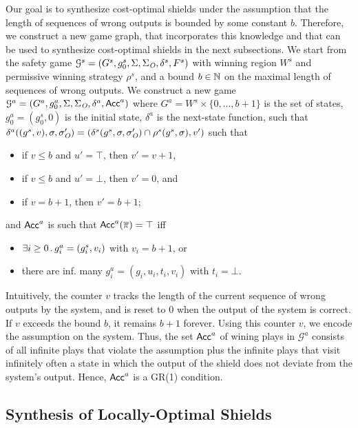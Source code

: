 Our goal is to synthesize cost-optimal shields under the assumption that the length of sequences of wrong outputs is bounded by some
constant $b$. Therefore, we construct a new game graph, that incorporates this knowledge and that can be used to synthesize
cost-optimal shields in the next subsections.
%
We start from the safety game $\mathcal G^s = (G^s, g_0^s,\Sigma,\Sigma_{\textit{O}},\delta^s,F^s)$ with winning region $W^s$ and permissive winning strategy $\rho^s$, and a bound $b\in\mathbb{N}$ on the maximal length of sequences of wrong outputs.
%
We construct a new game $\mathcal G^{a} = (G^{a}, g_0^{a},\Sigma,\Sigma_{\textit{O}},\delta^{a},\mathsf{Acc}^{a})$
where $G^{a} = W^s \times \{0,\ldots,b+1\}$ is the set of states,
$g_0^{a} = (g_0^s,0)$ is the initial state,
$\delta^{a}$ is the next-state function, such that
%
$\delta^{a}((g^s,v),\sigma,\sigma_{\textit{O}}')=( \delta^s(g^s, \sigma,\sigma_{\textit{O}}')\cap\rho^s(g^s, \sigma),v')$ such that
\begin{itemize}
\item if $v \leq b$ and $u'=\top$, then $v' = v+1$,
\item if $v \leq b$ and $u'=\bot$, then $v' = 0$, and
\item if $v = b +1$, then $v' = b+1$; 
\end{itemize}
and $\mathsf{Acc}^{a}$ is such that  $\mathsf{Acc}^{a}(\overline{\pi})=\top$ iff
\begin{itemize}
\item $\exists i \geq 0 \operatorname{\mathbin{.}} g_i^{a}= (g^s_i,v_i)$ with $v_i = b+1$, or
\item there are inf. many $g_i^{a}= (g_i,u_i, t_i, v_i)$ with $t_i = \bot$.
\end{itemize}

Intuitively, the counter $v$ tracks the length of the current sequence of wrong outputs by the system, and is reset to $0$ when the output of the system is correct. If $v$ exceeds the bound $b$, it remains $b+1$ forever.
Using this counter $v$, we encode the assumption on the system. Thus, the set $\mathsf{Acc}^a$ of wining plays in $\mathcal G^a$ consists of all infinite plays that violate the assumption plus the infinite plays that visit infinitely often a state in which the output of the shield does not deviate from the system's output. Hence, $\mathsf{Acc}^a$ is a GR(1)  condition.

\subsection{Synthesis of Locally-Optimal Shields}\label{sec:shieldsynth-local}

